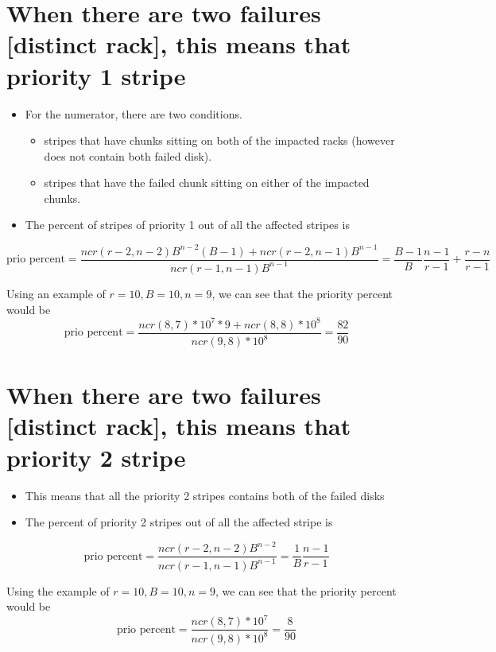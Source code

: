 \documentclass[journal]{IEEEtran}
\begin{document}
\section{When there are two failures [distinct rack], this means that \textbf{priority 1 stripe}}
\begin{itemize}
  \item For the numerator, there are two conditions.
  \begin{itemize}
    \item stripes that have chunks sitting on both of the impacted racks (however does not contain both failed disk).
    \item stripes that have the failed chunk sitting on either of the impacted chunks.
  \end{itemize}
  \item The percent of stripes of priority 1 out of all the affected stripes is
\end{itemize}

\begin{equation*}
  \text{prio percent}=\frac{ncr(r-2,n-2)B^{n-2}(B-1)+ncr(r-2,n-1)B^{n-1}}{ncr(r-1,n-1)B^{n-1}}=\frac{B-1}{B}\frac{n-1}{r-1}+\frac{r-n}{r-1}
\end{equation*}

Using an example of $r=10,B=10,n=9$, we can see that the priority percent would be
\begin{equation*}
  \text{prio percent}=\frac{ncr(8,7)*10^7*9+ncr(8,8)*10^8}{ncr(9,8)*10^8}=\frac{82}{90}
\end{equation*}

\section{When there are two failures [distinct rack], this means that \textbf{priority 2 stripe}}
\begin{itemize}
  \item This means that all the priority 2 stripes contains both of the failed disks
  \item The percent of priority 2 stripes out of all the affected stripe is
\end{itemize}

\begin{equation*}
  \text{prio percent}=\frac{ncr(r-2,n-2)B^{n-2}}{ncr(r-1,n-1)B^{n-1}}=\frac{1}{B}\frac{n-1}{r-1}
\end{equation*}

Using the example of $r=10,B=10,n=9$, we can see that the priority percent would be
\begin{equation*}
  \text{prio percent}=\frac{ncr(8,7)*10^7}{ncr(9,8)*10^8}=\frac{8}{90}
\end{equation*}
\end{document}
